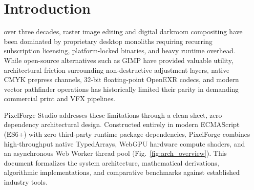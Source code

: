 \documentclass[10pt,journal,compsoc]{IEEEtran}
\begin{document}
\maketitle
\IEEEdisplaynontitleabstractindextext
\IEEEpeerreviewmaketitle

\section{Introduction}
 over three decades, raster image editing and digital darkroom compositing have been dominated by proprietary desktop monoliths requiring recurring subscription licensing, platform-locked binaries, and heavy runtime overhead. While open-source alternatives such as GIMP have provided valuable utility, architectural friction surrounding non-destructive adjustment layers, native CMYK prepress channels, 32-bit floating-point OpenEXR codecs, and modern vector pathfinder operations has historically limited their parity in demanding commercial print and VFX pipelines.

PixelForge Studio addresses these limitations through a clean-sheet, zero-dependency architectural design. Constructed entirely in modern ECMAScript (ES6+) with zero third-party runtime package dependencies, PixelForge combines high-throughput native TypedArrays, WebGPU hardware compute shaders, and an asynchronous Web Worker thread pool (Fig.~\ref{fig:arch_overview}). This document formalizes the system architecture, mathematical derivations, algorithmic implementations, and comparative benchmarks against established industry tools.
\end{document}
